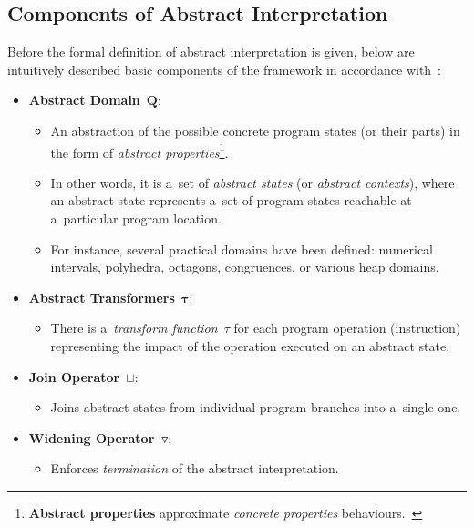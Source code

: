 \subsection{Components of Abstract Interpretation}
\label{sec:AIComponents}

Before the formal definition of abstract interpretation is given, below are intuitively described basic components of the framework in accordance with~\cite{AICousotWeb, AIBasedFormalMethodsCousot, savAI, programAnalysisNielson}:
\begin{itemize}
    \item \textbf{Abstract Domain}~$ \boldsymbol{Q} $:
        \begin{itemize}
            \item An abstraction of the possible concrete program states (or their parts) in the form of \emph{abstract properties}\footnote{\textbf{Abstract properties} approximate \emph{concrete properties} behaviours.~\cite{AIBasedFormalMethodsCousot}}.
                
            \item In other words, it is a~set of \emph{abstract states} (or \emph{abstract contexts}), where an abstract state represents a~set of program states reachable at a~particular program location.
            
            \item For instance, several practical domains have been defined: numerical intervals, polyhedra, octagons, congruences, or various heap domains.
        \end{itemize}

    \item \textbf{Abstract Transformers}~$ \boldsymbol{\tau} $:
        \begin{itemize}
            \item There is a~\emph{transform function}~$ \tau $ for each program operation (instruction) representing the impact of the operation executed on an abstract state.
        \end{itemize}

    \item \textbf{Join Operator}~$ \boldsymbol{\sqcup} $:
        \begin{itemize}
            \item Joins abstract states from individual program branches into a~single one.
        \end{itemize}

    \item \textbf{Widening Operator~$ \boldsymbol{\triangledown} $}:
        \begin{itemize}
            \item Enforces \emph{termination} of the abstract interpretation.


\end{itemize}
\end{itemize}
